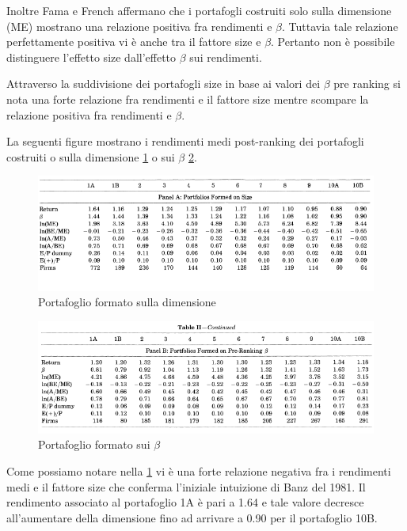 Inoltre Fama e French affermano che i portafogli costruiti solo sulla dimensione (ME) mostrano una relazione positiva fra rendimenti e $\beta$. Tuttavia tale relazione perfettamente positiva vi è anche tra il fattore size e $\beta$. Pertanto non è possibile distinguere l'effetto size dall'effetto $\beta$ sui rendimenti. 

Attraverso la suddivisione dei portafogli size in base ai valori dei $\beta$ pre ranking si nota una forte relazione fra rendimenti e il fattore size mentre scompare la relazione positiva fra rendimenti e $\beta$.

La seguenti figure mostrano i rendimenti medi post-ranking dei portafogli costruiti o sulla dimensione \ref{fig:table-ii-part-1} o sui $\beta$ \ref{fig:table-ii-part-2}. 
\newpage

\begin{figure}[h]
	\centering
\includegraphics[width=1\linewidth]{"imgs/table II part 1"}
\caption{Portafoglio formato sulla dimensione}
\label{fig:table-ii-part-1}
\end{figure}



\begin{figure}[h]
	
	\centering
\includegraphics[width=1\linewidth]{"imgs/TABBLE II PART 2"}
\caption{Portafoglio formato sui $\beta$}
\label{fig:table-ii-part-2}
\end{figure}


Come possiamo notare nella \ref{fig:table-ii-part-1} vi è una forte relazione negativa fra i rendimenti medi e il fattore size che conferma l'iniziale intuizione di Banz del 1981. Il rendimento associato al portafoglio 1A è pari a 1.64 e tale valore decresce all'aumentare della dimensione fino ad arrivare a 0.90 per il portafoglio 10B. 

